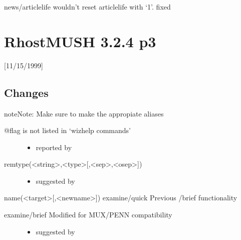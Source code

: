 \documentclass[letterpaper,10pt,english]{sphinxmanual}
\begin{document}
\sphinxAtStartPar
news/articlelife wouldn’t reset articlelife with ‘\sphinxhyphen{}1’.  \textendash{} fixed


\section{RhostMUSH 3.2.4 p3}
\label{\detokenize{changelog:rhostmush-3-2-4-p3}}\label{\detokenize{changelog:changelog-3-2-4p3}}
\sphinxAtStartPar
{[}11/15/1999{]}


\subsection{Changes}
\label{\detokenize{changelog:id83}}
\begin{sphinxadmonition}{note}{Note:}
\sphinxAtStartPar
Make sure to make the appropiate aliases
\end{sphinxadmonition}
\begin{description}
\item[{@flag is not listed in ‘wizhelp commands’}] \leavevmode\begin{itemize}
\item {} 
\sphinxAtStartPar
reported by 

\end{itemize}

\item[{remtype(\textless{}string\textgreater{},\textless{}type\textgreater{}{[},\textless{}sep\textgreater{},\textless{}osep\textgreater{}{]})}] \leavevmode\begin{itemize}
\item {} 
\sphinxAtStartPar
suggested by 

\end{itemize}

\end{description}

\sphinxAtStartPar
name(\textless{}target\textgreater{}{[},\textless{}newname\textgreater{}{]})
examine/quick \sphinxhyphen{} Previous /brief functionality
\begin{description}
\item[{examine/brief \sphinxhyphen{} Modified for MUX/PENN compatibility}] \leavevmode\begin{itemize}
\item {} 
\sphinxAtStartPar
suggested by 

\end{itemize}

\end{description}
\end{document}
